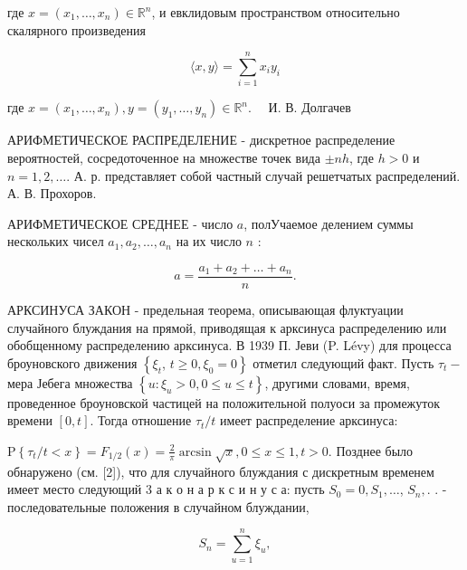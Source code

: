 \documentclass[10pt]{article}
\begin{document}
где $x=\left(x_{1}, \ldots, x_{n}\right) \in \mathbb{R}^{n}$, и евклидовым пространством относительно скалярного произведения



\[

\langle x, y\rangle=\sum_{i=1}^{n} x_{i} y_{i}

\]



где $x=\left(x_{1}, \ldots, x_{n}\right), y=\left(y_{1}, \ldots, y_{n}\right) \in \mathbb{R}^{n} . \quad$ И. В. Долгачев



АРИФМЕТИЧЕСКОЕ РАСПРЕДЕЛЕНИЕ - дискретное распределение вероятностей, сосредоточенное на множестве точек вида $\pm n h$, где $h>0$ и $n=1,2, \ldots$. А. р. представляет собой частный случай решетчатых распределений. А. В. Прохоров.



АРИФМЕТИЧЕСКОЕ СРЕДНЕЕ - число $a$, полУчаемое делением суммы нескольких чисел $a_{1}, a_{2}, \ldots, a_{n}$ на их число $n$ :



\[

a=\frac{a_{1}+a_{2}+\ldots+a_{n}}{n} .

\]



АРКСИНУСА ЗАКОН - предельная теорема, описывающая флуктуации случайного блуждания на прямой, приводящая к арксинуса распределению или обобщенному распределению арксинуса. В 1939 П. Јеви (P. Lévy) для процесса броуновского движения $\left\{\xi_{t}\right.$, $\left.t \geqslant 0, \xi_{0}=0\right\}$ отметил следующий факт. Пусть $\tau_{t}-$ мера Јебега множества $\left\{u: \xi_{u}>0,0 \leqslant u \leqslant t\right\}$, другими словами, время, проведенное броуновской частицей на положительной полуоси за промежуток времени $[0, t]$. Тогда отношение $\tau_{t} / t$ имеет распределение арксинуса:



$\mathrm{P}\left\{\tau_{t} / t<x\right\}=F_{1 / 2}(x)=\frac{2}{\pi} \arcsin \sqrt{x}, 0 \leqslant x \leqslant 1, t>0$. Позднее было обнаружено (см. [2]), что для случайного блуждания с дискретным временем имеет место следующий 3 а к о н а р к с и н у с а: пусть $S_{0}=0, S_{1}, \ldots$, $S_{n},$. . - последовательные положения в случайном блуждании,



\[

S_{n}=\sum_{u=1}^{n} \xi_{u},

\]
\end{document}

